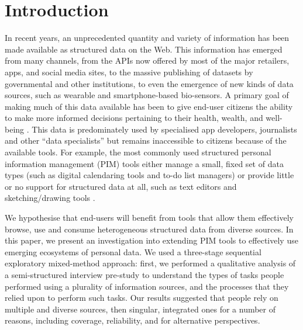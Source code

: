 \documentclass{sigchi}
\begin{document}



\section{Introduction}

In recent years, an unprecedented quantity and variety of information has been made available as structured data on the Web.  This information has emerged from many channels, from the APIs now offered by most of the major retailers, apps, and social media sites, to the massive publishing of datasets by governmental and other institutions, to even the emergence of new kinds of data sources, such as wearable and smartphone-based bio-sensors.  A primary goal of making much of this data available has been to give end-user citizens the ability to make more informed decisions pertaining to their health, wealth, and well-being \cite{Shadbolt:2006:SWR:1155313.1155373}.  This data is predominately used by specialised app developers, journalists and other ``data specialists'' but remains inaccessible to citizens because of the available tools.  For example, the most commonly used structured personal information management (PIM) tools either manage a small, fixed set of data types (such as digital calendaring tools and  to-do list managers) or provide little or no support for structured data at all, such as text editors and sketching/drawing tools \cite{infoscraps}.   

We hypothesise that end-users will benefit from tools that allow them effectively browse, use and consume heterogeneous structured data from diverse sources. In this paper, we present an investigation into extending PIM tools to effectively use emerging ecosystems of personal data.  We used a three-stage sequential exploratory mixed-method approach: first, we performed a qualitative analysis of a semi-structured interview pre-study to understand the types of tasks people performed using a plurality of information sources, and the processes that they relied upon to perform such tasks.  Our results suggested that people rely on multiple and diverse sources, then singular, integrated ones for a number of reasons, including coverage, reliability, and for alternative perspectives.  
\end{document}
